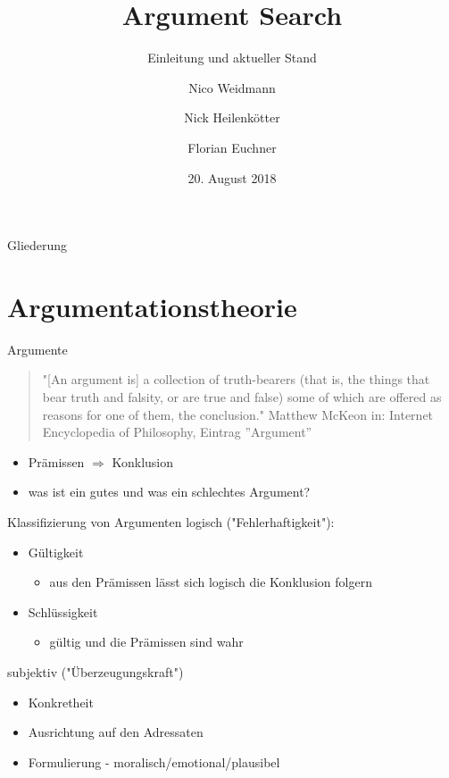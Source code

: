 \documentclass{beamer}
\title{Argument Search}
\subtitle{Einleitung und aktueller Stand}
\author{Nico Weidmann \and Nick Heilenkötter \and Florian Euchner}
\date{20. August 2018}
\begin{document}
	\begin{frame}
		\maketitle
	\end{frame}

	\begin{frame}{Gliederung}
		\tableofcontents
	\end{frame}

	\section{Argumentationstheorie}
	\begin{frame}{Argumente}
		\begin{quote}
			"[An argument is] a collection of truth-bearers (that is, the things that bear truth and falsity, or are true and false) some of which are offered as reasons for one of them, the conclusion."
			\flushright \tiny Matthew McKeon in: Internet Encyclopedia of Philosophy, Eintrag ''Argument''
		\end{quote}
		\begin{itemize}[<+->]
			\item Prämissen $\Rightarrow$ Konklusion
			\item was ist ein gutes und was ein schlechtes Argument?
		\end{itemize}
	\end{frame}
	\begin{frame}{Klassifizierung von Argumenten}
		logisch ("Fehlerhaftigkeit"):
		\begin{itemize}[<+->]
			\item Gültigkeit
			\begin{itemize}
				\item aus den Prämissen lässt sich logisch die Konklusion folgern
			\end{itemize}
			\item Schlüssigkeit
			\begin{itemize}
				\item gültig und die Prämissen sind wahr
			\end{itemize}
		\end{itemize}
		subjektiv ("Überzeugungskraft")		\begin{itemize}[<+->]
			\item Konkretheit
			\item Ausrichtung auf den Adressaten
			\item Formulierung - moralisch/emotional/plausibel
		\end{itemize}
	\end{frame}
\end{document}
